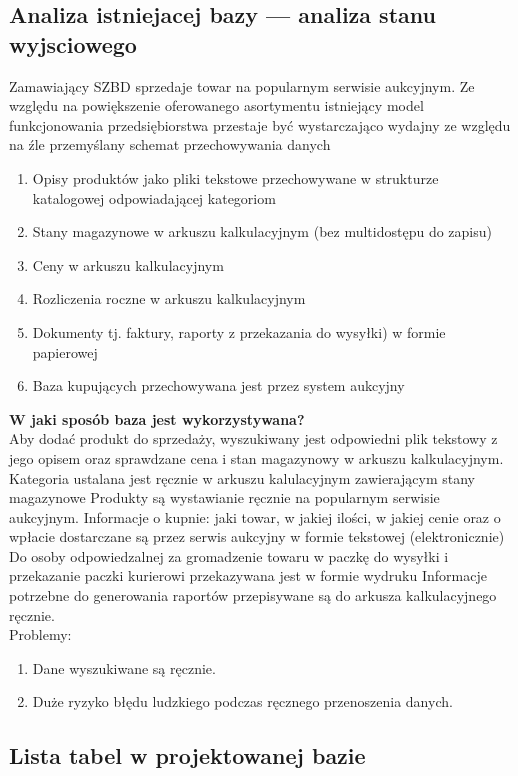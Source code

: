 \subsection{Analiza istniejacej bazy — analiza stanu wyjsciowego}
Zamawiający SZBD sprzedaje towar na popularnym serwisie aukcyjnym. 
Ze względu na powiększenie oferowanego asortymentu istniejący model funkcjonowania przedsiębiorstwa przestaje być wystarczająco wydajny 
ze względu na źle przemyślany schemat przechowywania danych
\begin{enumerate}
\item Opisy produktów jako pliki tekstowe przechowywane w strukturze katalogowej odpowiadającej kategoriom
\item Stany magazynowe w arkuszu kalkulacyjnym (bez multidostępu do zapisu)
\item Ceny w arkuszu kalkulacyjnym
\item Rozliczenia roczne w arkuszu kalkulacyjnym 
\item Dokumenty tj. faktury, raporty z przekazania do wysyłki) w formie papierowej
\item Baza kupujących przechowywana jest przez system aukcyjny	
\end{enumerate}
\textbf{W jaki sposób baza jest wykorzystywana?}\\
Aby dodać produkt do sprzedaży, wyszukiwany jest odpowiedni plik tekstowy z jego opisem oraz sprawdzane cena i stan magazynowy w arkuszu kalkulacyjnym.
Kategoria ustalana jest ręcznie w arkuszu kalulacyjnym zawierającym stany magazynowe
Produkty są wystawianie ręcznie na popularnym serwisie aukcyjnym.
Informacje o kupnie: jaki towar, w jakiej ilości, w jakiej cenie oraz o wpłacie dostarczane są przez serwis aukcyjny w formie tekstowej (elektronicznie)
Do osoby odpowiedzalnej za gromadzenie towaru w paczkę do wysyłki i przekazanie paczki kurierowi przekazywana jest w formie wydruku
Informacje potrzebne do generowania raportów przepisywane są do arkusza kalkulacyjnego ręcznie.\\
Problemy: 
\begin{enumerate}
	\item Dane wyszukiwane są ręcznie.
	\item Duże ryzyko błędu ludzkiego podczas ręcznego przenoszenia danych. 
\end{enumerate}

\subsection{Lista tabel w projektowanej bazie}

